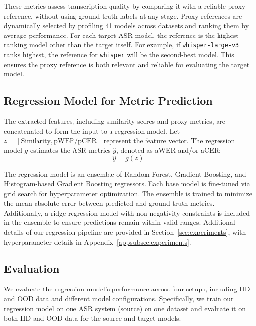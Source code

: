 

These metrics assess transcription quality by comparing it with a reliable proxy reference, without using ground-truth labels at any stage. Proxy references are dynamically selected by profiling 41 models across datasets and ranking them by average performance. For each target ASR model, the reference is the highest-ranking model other than the target itself. For example, if \texttt{whisper-large-v3} ranks highest, the reference for \texttt{whisper} will be the second-best model. This ensures the proxy reference is both relevant and reliable for evaluating the target model.





\subsection{Regression Model for Metric Prediction}
The extracted features, including similarity scores and proxy metrics, are concatenated to form the input to a regression model. Let $z = [\text{Similarity}, \text{pWER}/\text{pCER}]$ represent the feature vector. The regression model $g$ estimates the ASR metrics $\hat{y}$, denoted as aWER and/or aCER:
\begin{equation}
    \hat{y} = g(z)
\end{equation}

The regression model is an ensemble of Random Forest, Gradient Boosting, and Histogram-based Gradient Boosting regressors. Each base model is fine-tuned via grid search for hyperparameter optimization. The ensemble is trained to minimize the mean absolute error between predicted and ground-truth metrics. Additionally, a ridge regression model with non-negativity constraints is included in the ensemble to ensure predictions remain within valid ranges. Additional details of our regression pipeline are provided in Section~\ref{sec:experiments}, with hyperparameter details in Appendix~\ref{appsubsec:experiments}.


\subsection{Evaluation}\label{subsec:evaluation}
We evaluate the regression model's performance across four setups, including IID and OOD data and different model configurations. Specifically, we train our regression model on one ASR system (source) on one dataset and evaluate it on both IID and OOD data for the source and target models.


